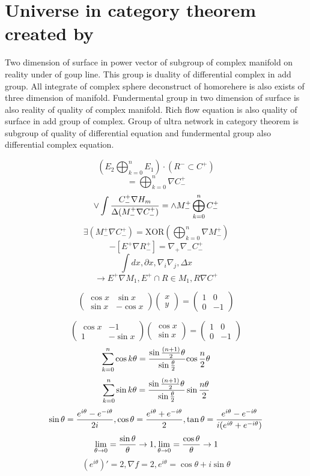 \documentclass{jsarticle}
\begin{document}
\section{Universe in category theorem created by}
Two dimension of surface in power vector of subgroup of complex manifold on reality under of goup line. 
This group is duality of differential complex in add group.
All integrate of complex sphere deconstruct of homorehere is also exists of three dimension of manifold.
Fundermental group in two dimension of surface is also reality of quality of complex manifold.
Rich flow equation is also quality of surface in add group of complex. 
Group of ultra network in category theorem is subgroup of quality of differential equation and fundermental group also
differential complex equation.

$$ (E_2 \bigoplus^{n}_{k=0}  E_1) \cdot (R^{-}\subset C^{+}) $$
$$ = \bigoplus^{n}_{k=0} \nabla C^{+}_{-} $$
$$ \vee \int {C^{+}_{-} \nabla H_m \over \Delta (M^{+}_{-} \nabla C^{+}_{-})} = \wedge M^{+}_{-} \bigoplus^{n}_{k=0} C^{+}_{-} $$
$$ \exists (M^{+}_{-} \nabla C^{+}_{-}) = \mathrm{XOR}(\bigoplus^{n}_{k=0} \nabla M^{+}_{-}) $$
$$ -[E^{+} \nabla R^{+}_{-}] = \nabla_{+} \nabla_{-} C^{+}_{-} $$
$$ \int dx, \partial x, \nabla_{i} \nabla_{j}, \Delta x $$
$$ \to E^{+} \nabla M_{1}, E^{+} \cap R \in M_{1}, R \nabla C^{+} $$


$$ \begin{pmatrix} \cos x & \sin x \\
                   \sin x & - \cos x \end{pmatrix}
   \begin{pmatrix} x \\
                   y \end{pmatrix}
   = \begin{pmatrix} 1 & 0 \\
                     0 & - 1 \end{pmatrix} $$

$$ \begin{pmatrix} \cos x & - 1 \\
                    1  & - \sin x \end{pmatrix}
   \begin{pmatrix} \cos x \\
                   \sin x \end{pmatrix}
   =  \begin{pmatrix} 1 & 0 \\
                     0 & - 1 \end{pmatrix} $$
		   $$ \sum^{n}_{k=0} \cos k\theta = {{\sin{(n + 1)\over 2 }\theta } \over {\sin{\theta \over 2}}}{\cos{n\over2}
		   \theta} $$
		  $$  \sum^{n}_{k=0} \sin k\theta = {{\sin{(n + 1)\over 2}\theta} \over {\sin{\theta \over 2}}}\sin{n\theta
		   \over 2} $$
		 $$  \sin\theta = {e^{i\theta} - e^{- i \theta} \over 2i},
		   \cos\theta = {e^{i\theta} + e^{- i \theta} \over 2},
    \tan \theta = {e^{i\theta} - e^{-i\theta} \over i(e^{i\theta} + e^{- i \theta})} $$
		   $$ \lim_{\theta \to 0} = {\sin \theta \over \theta} \to 1,
		   \lim_{\theta \to 0} = {\cos \theta \over \theta} \to 1 $$
		   $$ {(e^{i\theta})}' = 2,
		   \nabla f = 2,
		   e^{i\theta} = \cos \theta + i \sin \theta $$
\end{document}
